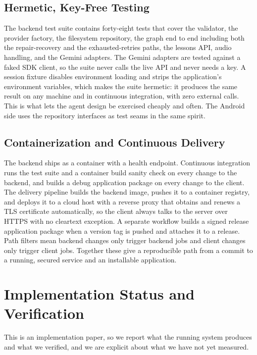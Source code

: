 \documentclass[conference]{IEEEtran}
\begin{document}
\subsection{Hermetic, Key-Free Testing}
The backend test suite contains forty-eight tests that cover the validator, the
provider factory, the filesystem repository, the graph end to end including both
the repair-recovery and the exhausted-retries paths, the lessons API, audio
handling, and the Gemini adapters. The Gemini adapters are tested against a faked
SDK client, so the suite never calls the live API and never needs a key. A
session fixture disables environment loading and strips the application's
environment variables, which makes the suite hermetic: it produces the same
result on any machine and in continuous integration, with zero external calls.
This is what lets the agent design be exercised cheaply and often. The Android
side uses the repository interfaces as test seams in the same spirit.

\subsection{Containerization and Continuous Delivery}
The backend ships as a container with a health endpoint. Continuous integration
runs the test suite and a container build sanity check on every change to the
backend, and builds a debug application package on every change to the client.
The delivery pipeline builds the backend image, pushes it to a container
registry, and deploys it to a cloud host with a reverse proxy that obtains and
renews a TLS certificate automatically, so the client always talks to the server
over HTTPS with no cleartext exception. A separate workflow builds a signed
release application package when a version tag is pushed and attaches it to a
release. Path filters mean backend changes only trigger backend jobs and client
changes only trigger client jobs. Together these give a reproducible path from a
commit to a running, secured service and an installable application.

\section{Implementation Status and Verification}
\label{sec:eval}

This is an implementation paper, so we report what the running system produces
and what we verified, and we are explicit about what we have not yet measured.
\end{document}
